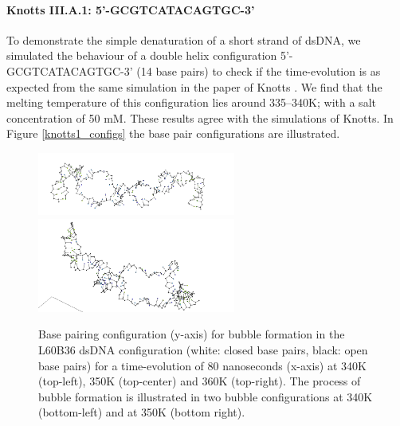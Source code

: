 \paragraph{Knotts III.A.1: 5'-GCGTCATACAGTGC-3'} To demonstrate the simple denaturation of a short strand of dsDNA, we simulated the behaviour of a double helix configuration 5'-GCGTCATACAGTGC-3' (14 base pairs) to check if the time-evolution is as expected from the same simulation in the paper of Knotts \etal \cite{knotts2007coarse}.
We find that the melting temperature of this configuration lies around 335--340K; with a salt concentration of 50 mM.
These results agree with the simulations of Knotts. In Figure \ref{knotts1_configs} the base pair configurations are illustrated.

\begin{figure}[hbt] \begin{minipage}{4.5cm} \end{minipage} \begin{minipage}{4.5cm}  \end{minipage}
\begin{minipage}{4cm}  \end{minipage} 
\begin{center}
\includegraphics[width=6.5cm]{images/L60B36_bubble2.png} \includegraphics[width=6.5cm]{images/L60B36_bubble1.png}
\caption{Base pairing configuration (y-axis) for bubble formation in the L60B36 dsDNA configuration (white: closed base pairs, black: open base pairs) for a time-evolution of 80 nanoseconds (x-axis) at 340K (top-left), 350K (top-center) and 360K (top-right). The process of bubble formation is illustrated in two bubble configurations at 340K (bottom-left) and at 350K (bottom right). }\label{L60B36_configs}
\end{center}
\end{figure}


